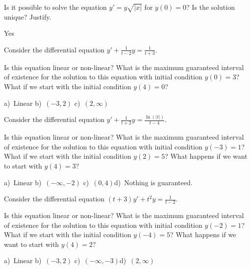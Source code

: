\begin{exercise}
Is it possible to solve the equation $y' = y\sqrt{\lvert x\rvert}$ for
$y(0) = 0$?  Is the solution unique?
Justify.
\end{exercise}
\comboSol{%
}
{%
Yes
}

\begin{exercise}
Consider the differential equation $y' + \frac{1}{t-2}y = \frac{1}{t+3}$. 
\begin{tasks}
\task Is this equation linear or non-linear?
\task What is the maximum guaranteed interval of existence for the solution to this equation with initial condition $y(0) = 3$?
\task What if we start with the initial condition $y(4) = 0$?
\end{tasks}
\end{exercise}
\comboSol{%
}
{%
a)~Linear \quad b)~$(-3,2)$ \quad c)~$(2,\infty)$
}

\begin{exercise}
Consider the differential equation $y' + \frac{1}{t+2}y = \frac{\ln(|t|)}{t-4}$. 
\begin{tasks}
\task Is this equation linear or non-linear?
\task What is the maximum guaranteed interval of existence for the solution to this equation with initial condition $y(-3) = 1$?
\task What if we start with the initial condition $y(2) = 5$?
\task What happens if we want to start with $y(4) = 3$?
\end{tasks}
\end{exercise}
\comboSol{%
}
{%
a)~Linear \quad b)~$(-\infty, -2)$ \quad c)~$(0, 4)$\quad d)~Nothing is guaranteed.
}

\begin{exercise}
Consider the differential equation $(t+3)y' + t^2 y = \frac{1}{t-2}$. 
\begin{tasks}
\task Is this equation linear or non-linear?
\task What is the maximum guaranteed interval of existence for the solution to this equation with initial condition $y(-2) = 1$?
\task What if we start with the initial condition $y(-4) = 5$?
\task What happens if we want to start with $y(4) = 2$?
\end{tasks}
\end{exercise}
\comboSol{%
}
{%
a)~Linear \quad b)~$(-3, 2)$ \quad c)~$(-\infty, -3)$\quad d)~$(2,\infty)$
}

